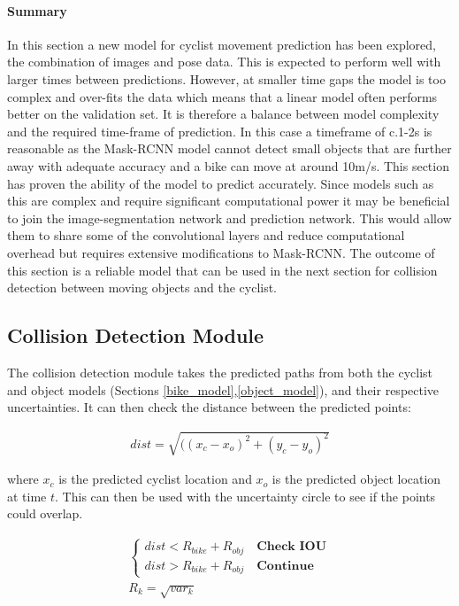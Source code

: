 \documentclass[11pt,twoside]{report}
\begin{document}
\paragraph{Summary}
In this section a new model for cyclist movement prediction has been explored, the combination of images and pose data. This is expected to perform well with larger times between predictions. However, at smaller time gaps the model is too complex and over-fits the data which means that a linear model often performs better on the validation set. It is therefore a balance between model complexity and the required time-frame of prediction. In this case a timeframe of c.1-2s is reasonable as the Mask-RCNN model cannot detect small objects that are further away with adequate accuracy and a bike can move at around 10m/s. This section has proven the ability of the model to predict accurately. Since models such as this are complex and require significant computational power it may be beneficial to join the image-segmentation network and prediction network. This would allow them to share some of the convolutional layers and reduce computational overhead but requires extensive modifications to Mask-RCNN. The outcome of this section is a reliable model that can be used in the next section for collision detection between moving objects and the cyclist. 

\subsection{Collision Detection Module} \label{coll_det}
The collision detection module takes the predicted paths from both the cyclist and object models (Sections \ref{bike_model},\ref{object_model}), and their respective uncertainties. It can then check the distance between the predicted points:

\begin{equation}
\begin{aligned}
dist = \sqrt{( (x_{c}-x_{o})^{2} + (y_{c}-y_{o})^{2}}
\end{aligned}
\label{distance_eq}
\end{equation}

where $x_{c}$ is the predicted cyclist location and $x_{o}$ is the predicted object location at time $t$. This can then be used with the uncertainty circle to see if the points could overlap.

\begin{equation}
\begin{aligned}
\begin{cases}
dist < R_{bike} + R_{obj} \quad \textbf{Check IOU} \\
dist > R_{bike} + R_{obj} \quad \textbf{Continue}
\end{cases} \\
R_{k} = \sqrt{var_{k}}
\end{aligned}
\label{horn_eq}
\end{equation}
\end{document}

